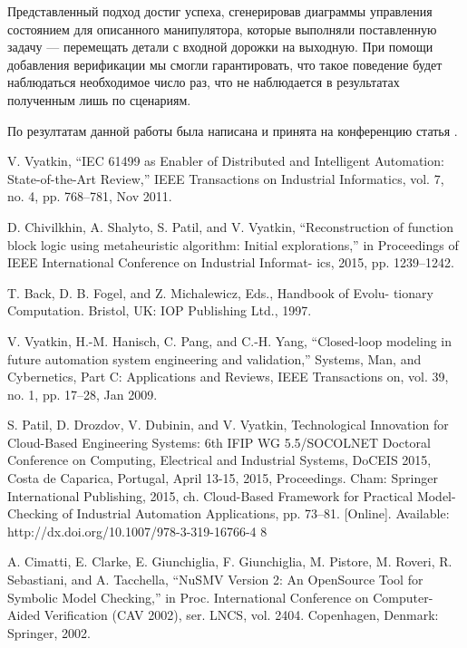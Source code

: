 \documentclass[14pt]{extarticle}
\theoremstyle{plain}
\theoremstyle{definition}
\begin{document}
Представленный подход достиг успеха, сгенерировав диаграммы управления состоянием для
описанного манипулятора, которые выполняли поставленную задачу --- перемещать детали
с входной дорожки на выходную. При помощи добавления верификации мы смогли гарантировать,
что такое поведение будет наблюдаться необходимое число раз, что не наблюдается в
результатах полученным лишь по сценариям.

По резултатам данной работы была написана и принята на конференцию статья \cite{this}.

\pagebreak

\begin{thebibliography}{99}

V. Vyatkin, “IEC 61499 as Enabler of Distributed and Intelligent
Automation: State-of-the-Art Review,” IEEE Transactions on Industrial
Informatics, vol. 7, no. 4, pp. 768–781, Nov 2011.

D. Chivilkhin, A. Shalyto, S. Patil, and V. Vyatkin, “Reconstruction of
function block logic using metaheuristic algorithm: Initial explorations,”
in Proceedings of IEEE International Conference on Industrial Informat-
ics, 2015, pp. 1239–1242.

T. Back, D. B. Fogel, and Z. Michalewicz, Eds., Handbook of Evolu-
tionary Computation. Bristol, UK: IOP Publishing Ltd., 1997.

V. Vyatkin, H.-M. Hanisch, C. Pang, and C.-H. Yang, “Closed-loop
modeling in future automation system engineering and validation,”
Systems, Man, and Cybernetics, Part C: Applications and Reviews, IEEE
Transactions on, vol. 39, no. 1, pp. 17–28, Jan 2009.

S. Patil, D. Drozdov, V. Dubinin, and V. Vyatkin, Technological
Innovation for Cloud-Based Engineering Systems: 6th IFIP WG
5.5/SOCOLNET Doctoral Conference on Computing, Electrical and
Industrial Systems, DoCEIS 2015, Costa de Caparica, Portugal, April
13-15, 2015, Proceedings. Cham: Springer International Publishing,
2015, ch. Cloud-Based Framework for Practical Model-Checking of
Industrial Automation Applications, pp. 73–81. [Online]. Available:
http://dx.doi.org/10.1007/978-3-319-16766-4 8

A. Cimatti, E. Clarke, E. Giunchiglia, F. Giunchiglia, M. Pistore,
M. Roveri, R. Sebastiani, and A. Tacchella, “NuSMV Version 2: An
OpenSource Tool for Symbolic Model Checking,” in Proc. International
Conference on Computer-Aided Verification (CAV 2002), ser. LNCS, vol.
2404. Copenhagen, Denmark: Springer, 2002.


\end{thebibliography}
\end{document}
